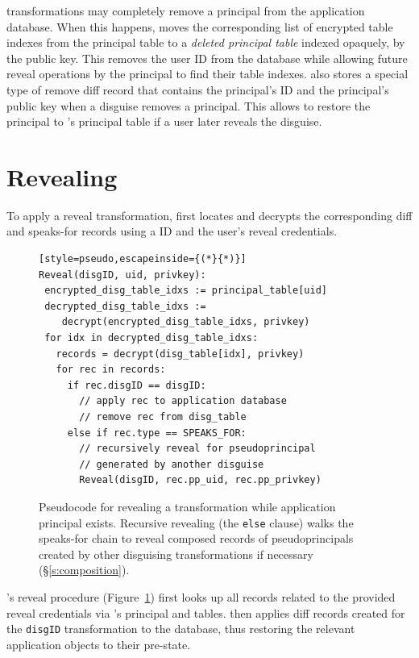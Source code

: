 %
\Xxing transformations may completely remove a principal from the
application database.
%
When this happens, \sys moves the corresponding list of encrypted \xx table
indexes from the principal table to a \emph{deleted principal table} indexed
opaquely, \eg by the public key.
%
This removes the user ID from the database while allowing future reveal
operations by the principal to find their \xx table indexes.
%
\sys also stores a special type of remove diff record that contains the
principal's ID and the principal's public key when a disguise removes a principal.  This
allows \sys to restore the principal to \sys's principal table if a user later
reveals the disguise.
%

\section{Revealing}
\label{s:reveal}

%
To apply a reveal transformation, \sys first locates and decrypts the
corresponding diff and speaks-for records using a \xx ID and the user’s reveal
credentials.
%

\begin{figure}[t]
  \small
\begin{lstlisting}[style=pseudo,escapeinside={(*}{*)}]
Reveal(disgID, uid, privkey):
 encrypted_disg_table_idxs := principal_table[uid]
 decrypted_disg_table_idxs :=
    decrypt(encrypted_disg_table_idxs, privkey)
 for idx in decrypted_disg_table_idxs:
   records = decrypt(disg_table[idx], privkey)
   for rec in records:
     if rec.disgID == disgID:
       // apply rec to application database
       // remove rec from disg_table
     else if rec.type == SPEAKS_FOR:
       // recursively reveal for pseudoprincipal
       // generated by another disguise
       Reveal(disgID, rec.pp_uid, rec.pp_privkey)
\end{lstlisting}
    \caption[Revealing restores all
    reachable disguised data using the user's reveal credentials.]{Pseudocode for revealing a \xxing transformation while
    application principal  exists. Recursive revealing (the
    \texttt{\small else} clause) walks the speaks-for chain to reveal composed
    records of pseudoprincipals created by other disguising transformations
    if necessary (\S\ref{s:composition}).}
  \label{f:revealpseudo}
\end{figure}

\sys's reveal procedure (Figure~\ref{f:revealpseudo}) first looks up all \xx
records related to the provided reveal credentials via \sys's principal and \xx
tables.
%
\sys then applies diff records created for the \verb+disgID+ \xx transformation
to the database, thus restoring the relevant
application objects to their pre-\xxed state.

